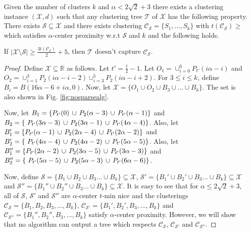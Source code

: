 \documentclass[anon,12pt]{colt2016} %
\newcommand{\mc}{\mathcal}
\begin{document}
\begin{theorem}
\label{thm:nosparsealg}
Given the number of clusters $k$ and $\alpha < 2\sqrt 2 + 3$ there exists a clustering instance $(\mc X, d)$ such that any clustering tree $\mc T$ of $\mc X$ has  the following property. There exists $\mc S \subseteq \mc X$ and there exists clustering $\mc C_{\mc S} = \{S_1, \ldots, S_k\}$ with $t(\mc C_{\mc S})\geq$ which satisfies $\alpha$-center proximity w.r.t $\mc S$ and $k$ and the following holds. 

If $|\mc X \setminus \mc S| \ge \frac{3 t(\mc C_{\mc S})}{2}+5$, then $\mc T$ doesn't capture $\mc C_{\mc S}$.
\end{theorem}

\begin{proof}
Define $\mc X \subseteq \mathbb{R}$ as follows. Let $t' = \frac{t}{2}-1$. Let $O_1 = \cup_{i=0}^6 P_{t'}(i\alpha-i)$ and $O_2 = \cup_{i=1}^3 P_2(i\alpha-i-2) \cup_{i=3}^5 P_2(i\alpha-i+2)$. For $3\le i\le k$, define $B_i = B(16\alpha-6+i\alpha, 0)$. Now, let $\mc X = \{O_1 \cup O_2 \cup B_3 \cup \ldots \cup B_k\}$. The set is also shown in Fig. \ref{fig:nosparsealg}.

Now, let $B_1 = \{P_{t'}(0) \thinspace\cup\thinspace  P_{2}(\alpha-3) \thinspace\cup\thinspace P_{t'}(\alpha-1) \}$ and $B_2 = \{\ P_{t'}(3\alpha-3) \thinspace\cup\thinspace P_{2}(3\alpha-1)\thinspace\cup\thinspace P_{t'}(4\alpha-4)\}$. Also, let $B_1' = \{P_{t'}(\alpha-1) \thinspace\cup\thinspace  P_{2}(2\alpha-4) \thinspace\cup\thinspace P_{t'}(2\alpha-2) \}$ and $B_2' = \{\ P_{t'}(4\alpha-4) \thinspace\cup\thinspace P_{2}(4\alpha-2)\thinspace\cup\thinspace P_{t'}(5\alpha-5)\}$. Also, let $B_1'' = \{P_{t'}(2\alpha-2) \thinspace\cup\thinspace  P_{2}(3\alpha-5) \thinspace\cup\thinspace P_{t'}(3\alpha-3) \}$ and $B_2'' = \{\ P_{t'}(5\alpha-5) \thinspace\cup\thinspace P_{2}(5\alpha-3)\thinspace\cup\thinspace P_{t'}(6\alpha-6)\}$. 

Now, define $\mc S = \{B_1 \cup B_2 \cup B_3\ldots \cup B_k\} \subseteq \mc X$, $\mc S' = \{B_1' \cup B_2' \cup B_3\ldots \cup B_k\} \subseteq \mc X$ and $\mc S'' = \{B_1'' \cup B_2'' \cup B_3\ldots \cup B_k\} \subseteq \mc X$. It is easy to see that for $\alpha \le 2\sqrt{2} + 3$, all of $\mc S$, $\mc S'$ and $\mc S''$ are $\alpha$-center $t$-min nice and the clusterings $\mc C_{\mc S} = \{B_1, B_2, B_3, \ldots, B_k\}$, $\mc C_{\mc S'} = \{B_1', B_2', B_3, \ldots, B_k\}$ and $\mc C_{\mc S''} = \{B_1'', B_2'', B_3, \ldots, B_k\}$ satisfy $\alpha$-center proximity. However, we will show that no algorithm can output a tree which respects $\mc C_{\mc S}$, $\mc C_{\mc S'}$ and $\mc C_{\mc S''}$.


\end{proof}
\end{document}
